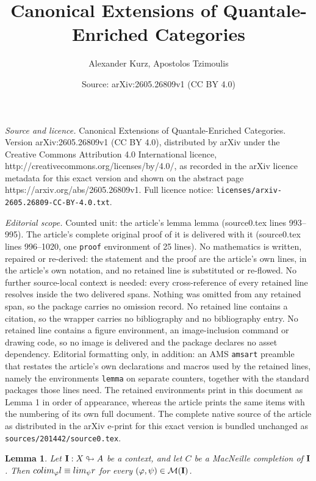 \documentclass[10pt,a4paper]{amsart}
\title{Canonical Extensions of Quantale-Enriched Categories}
\author{Alexander Kurz, Apostolos Tzimoulis}
\date{Source: arXiv:2605.26809v1 (CC BY 4.0)}
\newtheorem{lemma}{Lemma}
\newcommand{\cont}{{\bf I}}
\begin{document}
\maketitle

\noindent\emph{Source and licence.} Canonical Extensions of Quantale-Enriched Categories. Version arXiv:2605.26809v1 (CC BY 4.0), distributed by arXiv under the Creative Commons Attribution 4.0 International licence, http://creativecommons.org/licenses/by/4.0/, as recorded in the arXiv licence metadata for this exact version and shown on the abstract page https://arxiv.org/abs/2605.26809v1. Full licence notice: \texttt{licenses/arxiv-2605.26809-CC-BY-4.0.txt}.\par\smallskip

\noindent\textit{Editorial scope.} Counted unit: the article's lemma lemma (source0.tex lines 993--995). The article's complete original proof of it is delivered with it (source0.tex lines 996--1020, one \texttt{proof} environment of 25 lines). No mathematics is written, repaired or re-derived: the statement and the proof are the article's own lines, in the article's own notation, and no retained line is substituted or re-flowed.  No further source-local context is needed: every cross-reference of every retained line resolves inside the two delivered spans.  Nothing was omitted from any retained span, so the package carries no omission record.  No retained line contains a citation, so the wrapper carries no bibliography and no bibliography entry.  No retained line contains a figure environment, an image-inclusion command or drawing code, so no image is delivered and the package declares no asset dependency.  Editorial formatting only, in addition: an AMS \texttt{amsart} preamble that restates the article's own declarations and macros used by the retained lines, namely the environments \texttt{lemma} on separate counters, together with the standard packages those lines need.  The retained environments print in this document as Lemma 1 in order of appearance, whereas the article prints the same items with the numbering of its own full document.  The complete native source of the article as distributed in the arXiv e-print for this exact version is bundled unchanged as \texttt{sources/201442/source0.tex}.
\begin{lemma}
    Let $\cont:X\looparrowright A$ be a context, and let $C$ be a MacNeille completion of $\cont$. Then ${\rm colim}_{\varphi}l\equiv {\rm lim}_\psi r$ for every $(\varphi,\psi)\in\mathcal M(\cont)$.
\end{lemma}
\end{document}
